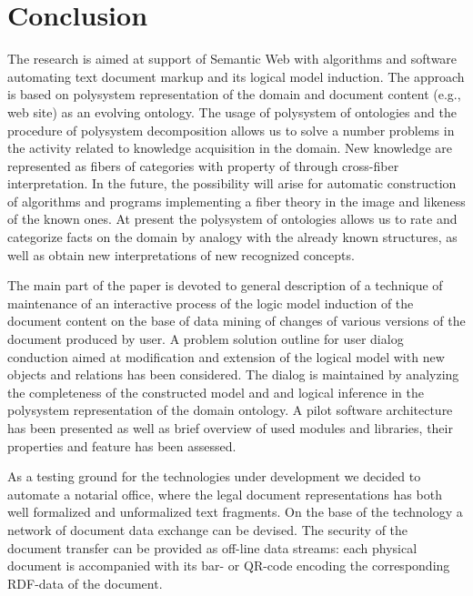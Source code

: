 \documentclass[conference]{IEEEtran}
\begin{document}
\section{Conclusion}

The research is aimed at support of Semantic Web with algorithms and
software automating text document markup and its logical model
induction.  The approach is based on polysystem representation of the
domain and document content (e.g., web site) as an evolving ontology.
The usage of polysystem of ontologies and the procedure of polysystem
decomposition \cite{father} allows us to solve a number problems in
the activity related to knowledge acquisition in the domain.  New
knowledge are represented as fibers of categories with property of
through cross-fiber interpretation.  In the future, the possibility
will arise for automatic construction of algorithms and programs
implementing a fiber theory in the image and likeness of the known
ones.  At present the polysystem of ontologies allows us to rate and
categorize facts on the domain by analogy with the already known
structures, as well as obtain new interpretations of new recognized
concepts.

The main part of the paper is devoted to general description of a
technique of maintenance of an interactive process of the logic model
induction of the document content on the base of data mining of
changes of various versions of the document produced by user.  A
problem solution outline for user dialog conduction aimed at
modification and extension of the logical model with new objects and
relations has been considered.  The dialog is maintained by analyzing
the completeness of the constructed model and and logical inference in
the polysystem representation of the domain ontology.  A pilot
software architecture has been presented as well as brief overview of
used modules and libraries, their properties and feature has been
assessed.

As a testing ground for the technologies under development we decided
to automate a notarial office, where the legal document
representations has both well formalized and unformalized text
fragments.  On the base of the technology a network of document data
exchange can be devised. The security of the document transfer can
be provided as off-line data streams: each physical document is
accompanied with its bar- or QR-code encoding the corresponding
RDF-data of the document.
\end{document}
